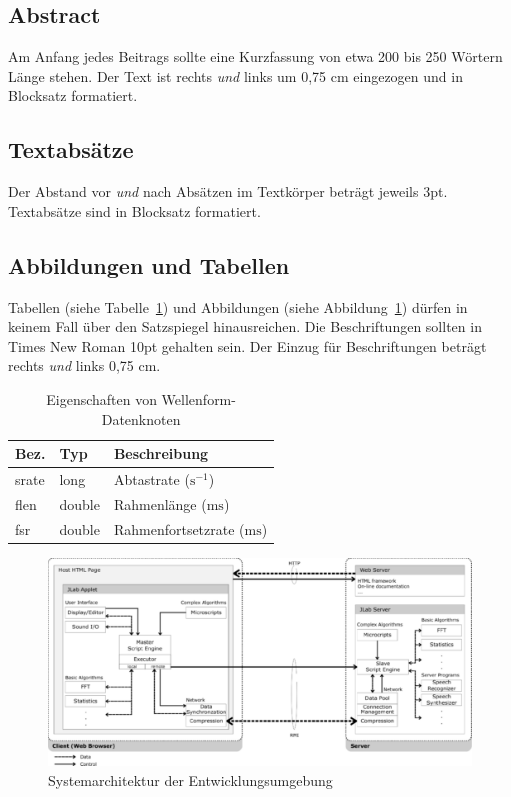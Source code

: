\documentclass[12pt,a4paper]{article}
\begin{document}
\subsection{Abstract}
Am Anfang jedes Beitrags sollte eine Kurzfassung von etwa 200 bis 250 Wörtern Länge stehen. 
Der Text ist rechts \emph{und} links um 0,75 cm eingezogen und in Blocksatz formatiert. 

\subsection{Textabsätze}
Der Abstand vor \emph{und} nach Absätzen im Textkörper beträgt jeweils 3pt. 
Textabsätze sind in Blocksatz formatiert.

\subsection{Abbildungen und Tabellen}
Tabellen (siehe Tabelle~\ref{tab:tabelle_1}) und Abbildungen (siehe Abbildung~\ref{fig:abbildung_1}) 
dürfen in keinem Fall über den Satzspiegel hinausreichen. 
Die Beschriftungen sollten in Times New Roman 10pt gehalten sein. Der Einzug für Beschriftungen 
beträgt rechts \emph{und} links 0,75 cm. 

\begin{table}[hbt]
  \caption{Eigenschaften von Wellenform-Datenknoten}
  \vspace{.5\baselineskip}
  \begin{tabular}{|l|l|l|}
    \hline
    \textbf{Bez.} & \textbf{Typ} & \textbf{Beschreibung}\\
    \hline
    srate & long & Abtastrate ($\mathrm{s}^{-1}$)\\
    \hline
    flen & double & Rahmenlänge ($\mathrm{ms}$)\\
    \hline
    fsr & double & Rahmenfortsetzrate ($\mathrm{ms}$)\\
    \hline
  \end{tabular}
  \label{tab:tabelle_1}
\end{table}

\begin{figure}[hbt]
  \centering
  \includegraphics[scale=.45]{abbildung_1}
  \caption{Systemarchitektur der Entwicklungsumgebung}
  \label{fig:abbildung_1}
\end{figure}
\end{document}
